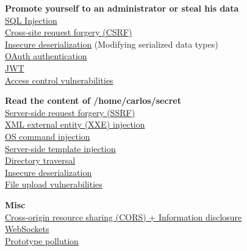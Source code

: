 \documentclass[
  letterpaper,
]{article}
\begin{document}
\textbf{Promote yourself to an administrator or steal his data}\\
\href{https://github.com/DingyShark/BurpSuiteCertifiedPractitioner\#sql-injection}{SQL
Injection}\\
\href{https://github.com/DingyShark/BurpSuiteCertifiedPractitioner\#cross-site-request-forgery-csrf}{Cross-site
request forgery (CSRF)}\\
\href{https://github.com/DingyShark/BurpSuiteCertifiedPractitioner\#insecure-deserialization}{Insecure
deserialization} (Modifying serialized data types)\\
\href{https://github.com/DingyShark/BurpSuiteCertifiedPractitioner\#oauth-authentication}{OAuth
authentication}\\
\href{https://github.com/DingyShark/BurpSuiteCertifiedPractitioner\#jwt}{JWT}\\
\href{https://github.com/DingyShark/BurpSuiteCertifiedPractitioner\#access-control-vulnerabilities}{Access
control vulnerabilities}

\textbf{Read the content of /home/carlos/secret}\\
\href{https://github.com/DingyShark/BurpSuiteCertifiedPractitioner\#server-side-request-forgery-ssrf}{Server-side
request forgery (SSRF)}\\
\href{https://github.com/DingyShark/BurpSuiteCertifiedPractitioner\#xml-external-entity-xxe-injection}{XML
external entity (XXE) injection}\\
\href{https://github.com/DingyShark/BurpSuiteCertifiedPractitioner\#os-command-injection}{OS
command injection}\\
\href{https://github.com/DingyShark/BurpSuiteCertifiedPractitioner\#server-side-template-injection}{Server-side
template injection}\\
\href{https://github.com/DingyShark/BurpSuiteCertifiedPractitioner\#directory-traversal}{Directory
traversal}\\
\href{https://github.com/DingyShark/BurpSuiteCertifiedPractitioner\#insecure-deserialization}{Insecure
deserialization}\\
\href{https://github.com/DingyShark/BurpSuiteCertifiedPractitioner\#file-upload-vulnerabilities}{File
upload vulnerabilities}

\textbf{Misc}\\
\href{https://github.com/DingyShark/BurpSuiteCertifiedPractitioner\#cross-origin-resource-sharing-cors--information-disclosure}{Cross-origin
resource sharing (CORS) + Information disclosure}\\
\href{https://github.com/DingyShark/BurpSuiteCertifiedPractitioner\#websockets}{WebSockets}\\
\href{https://github.com/DingyShark/BurpSuiteCertifiedPractitioner\#prototype-pollution}{Prototype
pollution}
\end{document}
